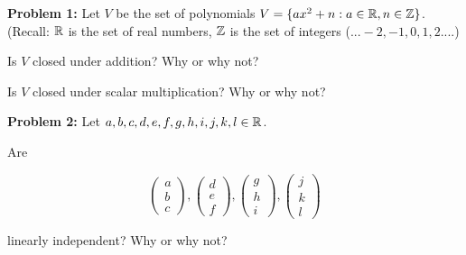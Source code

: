 \documentclass[a4paper,12pt]{article}
\begin{document}
{\Large{\bf Problem 1:}} Let $V$ be the set of polynomials $V=\{ax^2 + n: a \in \mathbb{R}, n \in \mathbb{Z}\}$. (Recall: $\mathbb{R}$ is the set of real numbers, $\mathbb{Z}$ is the set of integers ($...-2,-1,0,1,2...$.)

Is $V$ closed under addition? Why or why not?

Is $V$ closed under scalar multiplication? Why or why not?



\shunt

{\Large{\bf Problem 2:}} Let $a,b,c,d,e,f,g,h,i,j,k,l \in \mathbb{R}$.

Are 

\[\left( \begin{array}{ccc}a  \\ b \\ c  \end{array} \right), \left( \begin{array}{ccc}d  \\ e \\ f  \end{array} \right), \left( \begin{array}{ccc}g \\ h \\ i  \end{array} \right), \left( \begin{array}{ccc}j  \\ k \\ l  \end{array} \right)\]

linearly independent? Why or why not?
\end{document}
